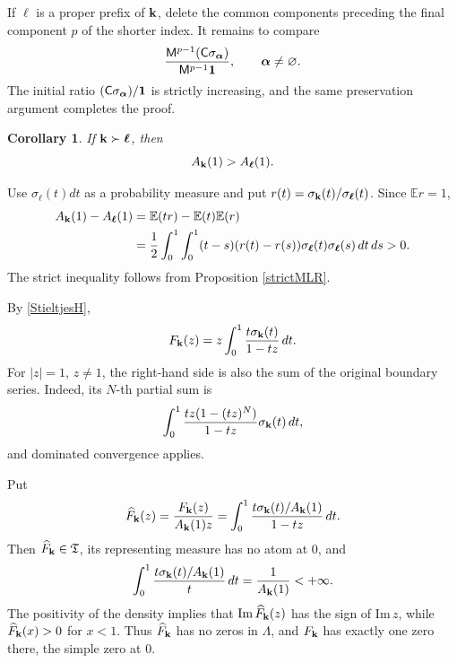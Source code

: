 \documentclass[12pt,a4paper]{amsart}
\makeatletter
\numberwithin{equation}{section}
\renewenvironment{proof}[1][Proof]{%
  \par\pushQED{\qed}%
  \normalfont\topsep6\p@\@plus6\p@\relax
  \trivlist
  \item[\hskip\labelsep\bfseries #1:]\ignorespaces
}{%
  \popQED\endtrivlist\@endpefalse
}
\theoremstyle{plain}
\newtheorem{Cor}[Thm]{Corollary}
\theoremstyle{definition}
\makeatother
\begin{document}
\begin{proof}
If ${\boldsymbol\ell}$ is a proper prefix of ${\bf k}$, delete the common components preceding the final component $p$ of the shorter index.  It remains to compare
\[
\frac{\mathsf{M}^{p-1}(\mathsf{C}\sigma_{\boldsymbol\alpha})}
{\mathsf{M}^{p-1}{\bf 1}},
\qquad {\boldsymbol\alpha}\neq\varnothing.
\]
The initial ratio $(\mathsf{C}\sigma_{\boldsymbol\alpha})/{\bf 1}$ is strictly increasing, and the same preservation argument completes the proof.
\end{proof}

\begin{Cor}\label{firstmomentstrict}
If ${\bf k}\succ{\boldsymbol\ell}$, then
\[
A_{\bf k}(1)>A_{\boldsymbol\ell}(1).
\]
\end{Cor}

\begin{proof}
Use $\sigma_{\boldsymbol\ell}(t)dt$ as a probability measure and put
$r(t)=\sigma_{\bf k}(t)/\sigma_{\boldsymbol\ell}(t)$.  Since $\mathbb{E}r=1$,
\[
\begin{split}
A_{\bf k}(1)-A_{\boldsymbol\ell}(1)
&=\mathbb{E}(tr)-\mathbb{E}(t)\mathbb{E}(r)\\
&=\frac12\int_0^1\int_0^1
(t-s)(r(t)-r(s))
\sigma_{\boldsymbol\ell}(t)\sigma_{\boldsymbol\ell}(s)\,dt\,ds>0.
\end{split}
\]
The strict inequality follows from Proposition \ref{strictMLR}.
\end{proof}

By \eqref{StieltjesH},
\begin{equation}\label{Fint}
F_{\bf k}(z)
=z\int_0^1\frac{t\sigma_{\bf k}(t)}{1-tz}\,dt.
\end{equation}
For $|z|=1$, $z\neq 1$, the right-hand side is also the sum of the original boundary series.  Indeed, its $N$-th partial sum is
\[
\int_0^1
\frac{tz(1-(tz)^N)}{1-tz}\sigma_{\bf k}(t)\,dt,
\]
and dominated convergence applies.

Put
\begin{equation}\label{Fhat}
\widehat F_{\bf k}(z)
=\frac{F_{\bf k}(z)}{A_{\bf k}(1)z}
=\int_0^1\frac{t\sigma_{\bf k}(t)/A_{\bf k}(1)}{1-tz}\,dt.
\end{equation}
Then $\widehat F_{\bf k}\in\mathfrak{T}$, its representing measure has no atom at $0$, and
\begin{equation}\label{denintegrable}
\int_0^1\frac{t\sigma_{\bf k}(t)/A_{\bf k}(1)}t\,dt
=\frac1{A_{\bf k}(1)}<+\infty.
\end{equation}
The positivity of the density implies that $\mathrm{Im}\,\widehat F_{\bf k}(z)$ has the sign of $\mathrm{Im}\,z$, while $\widehat F_{\bf k}(x)>0$ for $x<1$.  Thus $\widehat F_{\bf k}$ has no zeros in $\Lambda$, and $F_{\bf k}$ has exactly one zero there, the simple zero at $0$.
\end{document}
